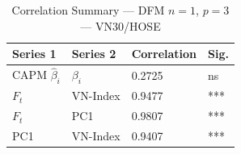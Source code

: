 \begin{table}[h]\centering
\caption{Correlation Summary — DFM $n=1$, $p=3$ — VN30/HOSE}
\begin{tabular}{llll}
\toprule
Series 1 & Series 2 & Correlation & Sig. \\
\midrule
CAPM $\hat{\beta}_i$ & $\beta_i$ & 0.2725 & ns \\
$F_t$ & VN-Index & 0.9477 & *** \\
$F_t$ & PC1 & 0.9807 & *** \\
PC1 & VN-Index & 0.9407 & *** \\
\bottomrule
\end{tabular}
\end{table}
